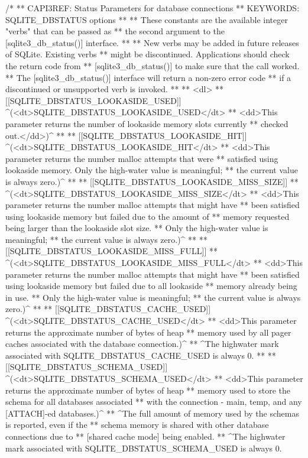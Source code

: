 \begin{Codex}[label=sqlite3.h,numbers=left]
{/*
** CAPI3REF: Status Parameters for database connections
** KEYWORDS: {SQLITE_DBSTATUS options}
**
** These constants are the available integer "verbs" that can be passed as
** the second argument to the [sqlite3_db_status()] interface.
**
** New verbs may be added in future releases of SQLite. Existing verbs
** might be discontinued. Applications should check the return code from
** [sqlite3_db_status()] to make sure that the call worked.
** The [sqlite3_db_status()] interface will return a non-zero error code
** if a discontinued or unsupported verb is invoked.
**
** <dl>
** [[SQLITE_DBSTATUS_LOOKASIDE_USED]] ^(<dt>SQLITE_DBSTATUS_LOOKASIDE_USED</dt>
** <dd>This parameter returns the number of lookaside memory slots currently
** checked out.</dd>)^
**
** [[SQLITE_DBSTATUS_LOOKASIDE_HIT]] ^(<dt>SQLITE_DBSTATUS_LOOKASIDE_HIT</dt>
** <dd>This parameter returns the number malloc attempts that were 
** satisfied using lookaside memory. Only the high-water value is meaningful;
** the current value is always zero.)^
**
** [[SQLITE_DBSTATUS_LOOKASIDE_MISS_SIZE]]
** ^(<dt>SQLITE_DBSTATUS_LOOKASIDE_MISS_SIZE</dt>
** <dd>This parameter returns the number malloc attempts that might have
** been satisfied using lookaside memory but failed due to the amount of
** memory requested being larger than the lookaside slot size.
** Only the high-water value is meaningful;
** the current value is always zero.)^
**
** [[SQLITE_DBSTATUS_LOOKASIDE_MISS_FULL]]
** ^(<dt>SQLITE_DBSTATUS_LOOKASIDE_MISS_FULL</dt>
** <dd>This parameter returns the number malloc attempts that might have
** been satisfied using lookaside memory but failed due to all lookaside
** memory already being in use.
** Only the high-water value is meaningful;
** the current value is always zero.)^
**
** [[SQLITE_DBSTATUS_CACHE_USED]] ^(<dt>SQLITE_DBSTATUS_CACHE_USED</dt>
** <dd>This parameter returns the approximate number of bytes of heap
** memory used by all pager caches associated with the database connection.)^
** ^The highwater mark associated with SQLITE_DBSTATUS_CACHE_USED is always 0.
**
** [[SQLITE_DBSTATUS_SCHEMA_USED]] ^(<dt>SQLITE_DBSTATUS_SCHEMA_USED</dt>
** <dd>This parameter returns the approximate number of bytes of heap
** memory used to store the schema for all databases associated
** with the connection - main, temp, and any [ATTACH]-ed databases.)^ 
** ^The full amount of memory used by the schemas is reported, even if the
** schema memory is shared with other database connections due to
** [shared cache mode] being enabled.
** ^The highwater mark associated with SQLITE_DBSTATUS_SCHEMA_USED is always 0.
}
\end{Codex}
